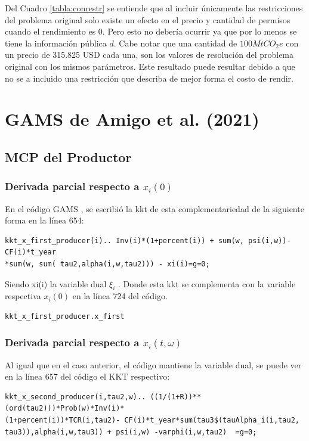 Del Cuadro \ref{tabla:conrestr} se entiende que al incluir únicamente las restricciones del problema original solo existe un efecto en el precio y cantidad de permisos cuando el rendimiento es 0. Pero esto no debería ocurrir ya que por lo menos se tiene la información pública $d$. Cabe notar que una cantidad de $100 MtCO_2 e$ con un precio de 315.825 USD cada una, son los valores de resolución del problema original con los mismos parámetros. Este resultado puede resultar debido a que no se a incluido una restricción que describa de mejor forma el costo de rendir.

\section{GAMS de Amigo et al. (2021)}\label{anexo:GAMScomp}
\subsection{MCP del Productor}

\subsubsection{Derivada parcial respecto a $x_i(0)$}

En el código GAMS , se escribió la kkt de esta complementariedad de la siguiente forma en la línea 654:
\begin{verbatim}
kkt_x_first_producer(i).. Inv(i)*(1+percent(i)) + sum(w, psi(i,w))- CF(i)*t_year
*sum(w, sum( tau2,alpha(i,w,tau2))) - xi(i)=g=0;
\end{verbatim}
Siendo xi(i) la variable dual $\xi_i$ . Donde esta kkt se complementa con la variable respectiva $x_i(0)$ en la línea 724 del código.
\begin{verbatim}
kkt_x_first_producer.x_first
\end{verbatim}

\subsubsection{Derivada parcial respecto a $x_i(t,\omega)$}

Al igual que en el caso anterior, el código mantiene la variable dual, se puede ver en la línea 657 del código el KKT respectivo:

\begin{verbatim}
kkt_x_second_producer(i,tau2,w).. ((1/(1+R))**(ord(tau2)))*Prob(w)*Inv(i)*
(1+percent(i))*TCR(i,tau2)- CF(i)*t_year*sum(tau3$(tauAlpha_i(i,tau2,
tau3)),alpha(i,w,tau3)) + psi(i,w) -varphi(i,w,tau2)  =g=0;
\end{verbatim}

